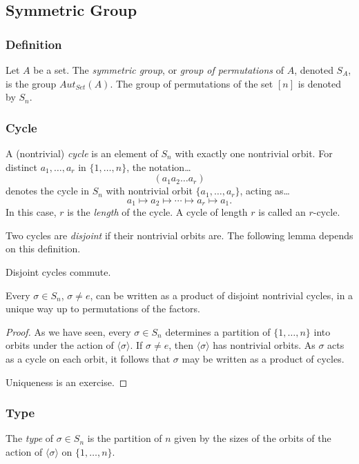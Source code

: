 \subsection{Symmetric Group}\label{symmetricgroup}

\subsubsection{Definition}
Let $A$ be a set. The \emph{symmetric group}, or \emph{group of permutations} of $A$, denoted $S_A$, is the group
$Aut_{Set}(A)$. The group of permutations of the set $[n]$ is denoted by $S_n$.

\subsubsection{Cycle}\label{cycle}
A (nontrivial) \emph{cycle} is an element of $S_n$ with exactly one nontrivial orbit. For distinct $a_1, \dots, a_r$ in $\{1, \dots, n \}$, the notation\dots
$$(a_1a_2\dots a_r)$$
denotes the cycle in $S_n$ with nontrivial orbit $\{ a_1, \dots, a_r \}$, acting as\dots
$$a_1 \mapsto a_2 \mapsto \cdots \mapsto a_r \mapsto a_1.$$
In this case, $r$ is the \emph{length} of the cycle. A cycle of length $r$ is called an $r$-cycle.

\label{disjointcycles}
Two cycles are \emph{disjoint} if their nontrivial orbits are. The following lemma depends on this definition.

\begin{lemma}
Disjoint cycles commute.
\end{lemma}

\begin{lemma}
\label{writingpermutations}
Every $\sigma \in S_n$, $\sigma \neq e$, can be written as a product of disjoint nontrivial cycles, in a unique way up to permutations of the factors.
\end{lemma}

\begin{proof}
As we have seen, every $\sigma \in S_n$ determines a partition of $\{ 1, \dots, n \}$ into orbits under the action of $\langle \sigma \rangle$. If $\sigma \neq e$, then
$\langle \sigma \rangle$ has nontrivial orbits. As $\sigma$ acts as a cycle on each orbit, it follows that $\sigma$ may be written as a product of cycles.

Uniqueness is an exercise.
\end{proof}

\subsubsection{Type}\label{permutationtype}
The \emph{type} of $\sigma \in S_n$ is the partition of $n$ given by the sizes of the orbits of the action of $\langle \sigma \rangle$ on $\{ 1, \dots, n \}$.\newline


